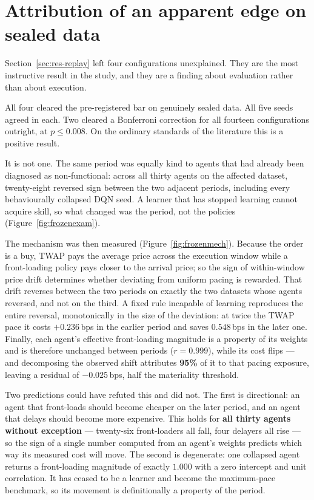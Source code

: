 \section{Attribution of an apparent edge on sealed data}\label{sec:res-apparent}

Section~\ref{sec:res-replay} left four configurations unexplained. They are the most
instructive result in the study, and they are a finding about evaluation rather than about
execution.

All four cleared the pre-registered bar on genuinely sealed data. All five seeds agreed in
each. Two cleared a Bonferroni correction for all fourteen configurations outright, at
$p \leq 0.008$. On the ordinary standards of the literature this is a positive result.

It is not one. The same period was equally kind to agents that had already been diagnosed as
non-functional: across all thirty agents on the affected dataset, twenty-eight reversed sign
between the two adjacent periods, including every behaviourally collapsed DQN seed. A learner
that has stopped learning cannot acquire skill, so what changed was the period, not the
policies (Figure~\ref{fig:frozenexam}).

The mechanism was then measured (Figure~\ref{fig:frozenmech}). Because the order is a buy,
TWAP pays the average price across the execution window while a front-loading policy pays
closer to the arrival price; so the sign of within-window price drift determines whether
deviating from uniform pacing is rewarded. That drift reverses between the two periods on
exactly the two datasets whose agents reversed, and not on the third. A fixed rule incapable
of learning reproduces the entire reversal, monotonically in the size of the deviation: at
twice the TWAP pace it costs $+0.236$\,bps in the earlier period and saves $0.548$\,bps in
the later one. Finally, each agent's effective front-loading magnitude is a property of its
weights and is therefore unchanged between periods ($r = 0.999$), while its cost flips ---
and decomposing the observed shift attributes \textbf{95\%} of it to that pacing exposure,
leaving a residual of $-0.025$\,bps, half the materiality threshold.

Two predictions could have refuted this and did not. The first is directional: an agent that
front-loads should become cheaper on the later period, and an agent that delays should become
more expensive. This holds for \textbf{all thirty agents without exception} --- twenty-six
front-loaders all fall, four delayers all rise --- so the sign of a single number computed
from an agent's weights predicts which way its measured cost will move. The second is
degenerate: one collapsed agent returns a front-loading magnitude of exactly $1.000$ with a
zero intercept and unit correlation. It has ceased to be a learner and become the
maximum-pace benchmark, so its movement is definitionally a property of the period.

